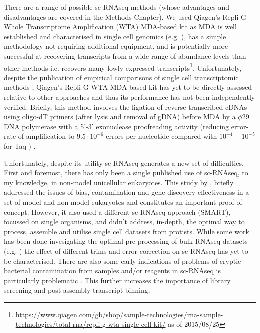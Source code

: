 There are a range of possible sc-RNAseq methods (whose advantages and disadvantages are covered in the Methods Chapter).
We used Qiagen's Repli-G Whole Transcriptome Amplification (WTA) MDA-based kit as MDA 
is well established and characterised in single cell genomics (e.g. \citep{Spits2006}), 
has a simple methodology not requiring additional equipment, and is potentially more successful at
recovering transcripts from a wide range of abundance levels than other methods i.e. recovers many lowly expressed transcripts\footnote{\hfill\url{https://www.qiagen.com/gb/shop/sample-technologies/rna-sample-technologies/total-rna/repli-g-wta-single-cell-kit/} as of 2015/08/25}.
Unfortunately, despite the publication of empirical comparisons of single cell transcriptomic methods \citep{Wu2014a}, 
Qiagen's Repli-G WTA MDA-based kit has yet to be directly assessed relative to other approaches and thus its performance has not
been independently verified. 
Briefly, this method involves the ligation of reverse transcribed cDNAs using oligo-dT primers (after lysis and 
removal of gDNA) before MDA by a \(\phi29\) DNA polymerase with a 5'-3' exonuclease proofreading activity 
(reducing error-rate of amplification to \(9.5\cdot10^{-6}\) errors per nucleotide \citep{Paez2004} compared with
\(10^{-4}-10^{-5}\) for Taq \citep{Tindall1988,Eckert1990}) \citep{Korfhage2015}.



Unfortunately, despite its utility sc-RNAseq generates a new set of difficulties.
First and foremost, there has only been a single published use of sc-RNAseq, to my knowledge, in non-model unicellular eukaryotes.   
This study by \citep{Kolisko2014}, briefly addressed the issues of bias, contamination and gene discovery effectiveness in a set of model and non-model eukaryotes and
constitutes an important proof-of-concept.  
However, it also used a different sc-RNAseq approach (SMART), focussed on single organisms, 
and didn't address, in-depth, the optimal way to process, assemble and utilise single cell datasets from protists.
While some work has been done invesigating the optimal pre-processing of bulk RNAseq datasets (e.g. \citep{Macmanes2013,Macmanes2015}) 
the effect of different trims and error correction on sc-RNAseq has yet to be characterised.  
There are also some early indications of problems of cryptic bacterial contamination
from samples and/or reagents in sc-RNAseq is particularly problematic \citep{Kolisko2014}. 
This further increases the importance of library screening and post-assembly transcript binning.

